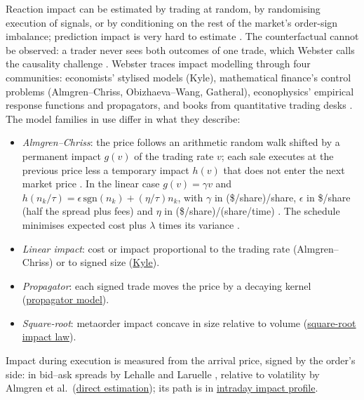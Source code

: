 \begin{qfdefinition}
 Reaction impact can be estimated by trading at random, by randomising execution of signals, or by conditioning on the rest of the market's order-sign imbalance; prediction impact is very hard to estimate \citep[chap.~11, sec.~11.2, pp.~211--212]{catalogue-0528}. The counterfactual cannot be observed: a trader never sees both outcomes of one trade, which Webster calls the causality challenge \citep[chap.~1, sec.~1.1.3, pp.~6--7]{wide-webster-price-impact}. Webster traces impact modelling through four communities: economists' stylised models (Kyle), mathematical finance's control problems (Almgren--Chriss, Obizhaeva--Wang, Gatheral), econophysics' empirical response functions and propagators, and books from quantitative trading desks \citep[chap.~1, sec.~1.1.5, pp.~9--15]{wide-webster-price-impact}. The model families in use differ in what they describe:
\begin{itemize}
\item \emph{Almgren--Chriss}: the price follows an arithmetic random walk shifted by a permanent impact $g(v)$ of the trading rate $v$; each sale executes at the previous price less a temporary impact $h(v)$ that does not enter the next market price \citep[author preprint of Dec.\ 2000, secs.~1.2--1.3, eqs.~(1)--(2), pp.~8--9]{alpha-almgren}. In the linear case $g(v)=\gamma v$ and $h(n_k/\tau)=\epsilon\,\mathrm{sgn}(n_k)+(\eta/\tau)n_k$, with $\gamma$ in (\$/share)/share, $\epsilon$ in \$/share (half the spread plus fees) and $\eta$ in (\$/share)/(share/time) \citep[author preprint of Dec.\ 2000, sec.~1.5, eqs.~(6)--(7), pp.~10--11]{alpha-almgren}. The schedule minimises expected cost plus $\lambda$ times its variance \citep[author preprint of Dec.\ 2000, sec.~2, pp.~12--13]{alpha-almgren}.
\item \emph{Linear impact}: cost or impact proportional to the trading rate (Almgren--Chriss) or to signed size (\hyperref[mod:kyle-single-auction]{Kyle}).
\item \emph{Propagator}: each signed trade moves the price by a decaying kernel (\hyperref[mod:propagator]{propagator model}).
\item \emph{Square-root}: metaorder impact concave in size relative to volume (\hyperref[ev:square-root-impact]{square-root impact law}).
\end{itemize}
Impact during execution is measured from the arrival price, signed by the order's side: in bid--ask spreads by Lehalle and Laruelle \citep[chap.~3, sec.~3.2.1, p.~204]{alpha-laruelle}, relative to volatility by Almgren et al.\ (\hyperref[meth:almgren-impact-estimation]{direct estimation}); its path is in \hyperref[ev:intraday-impact-profile]{intraday impact profile}.


\end{qfdefinition}
